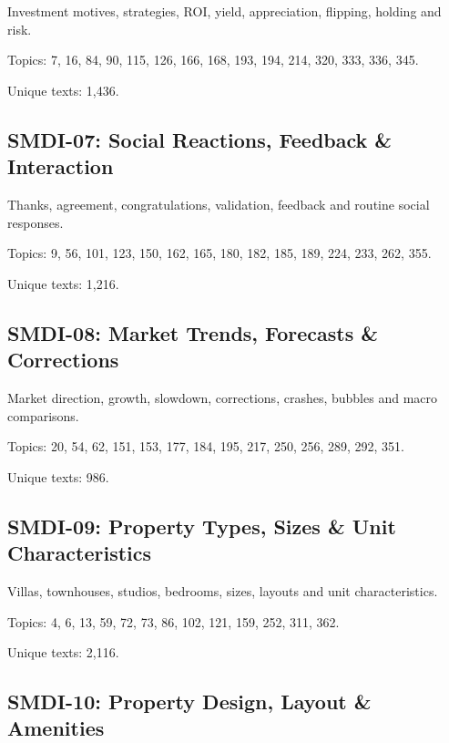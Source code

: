 \documentclass[10pt]{article}
\begin{document}
Investment motives, strategies, ROI, yield, appreciation, flipping, holding and risk.

\par Topics: 7, 16, 84, 90, 115, 126, 166, 168, 193, 194, 214, 320, 333, 336, 345.

\par Unique texts: 1,436.

\subsection*{SMDI-07: Social Reactions, Feedback \& Interaction}

Thanks, agreement, congratulations, validation, feedback and routine social responses.

\par Topics: 9, 56, 101, 123, 150, 162, 165, 180, 182, 185, 189, 224, 233, 262, 355.

\par Unique texts: 1,216.

\subsection*{SMDI-08: Market Trends, Forecasts \& Corrections}

Market direction, growth, slowdown, corrections, crashes, bubbles and macro comparisons.

\par Topics: 20, 54, 62, 151, 153, 177, 184, 195, 217, 250, 256, 289, 292, 351.

\par Unique texts: 986.

\subsection*{SMDI-09: Property Types, Sizes \& Unit Characteristics}

Villas, townhouses, studios, bedrooms, sizes, layouts and unit characteristics.

\par Topics: 4, 6, 13, 59, 72, 73, 86, 102, 121, 159, 252, 311, 362.

\par Unique texts: 2,116.

\subsection*{SMDI-10: Property Design, Layout \& Amenities}
\end{document}
